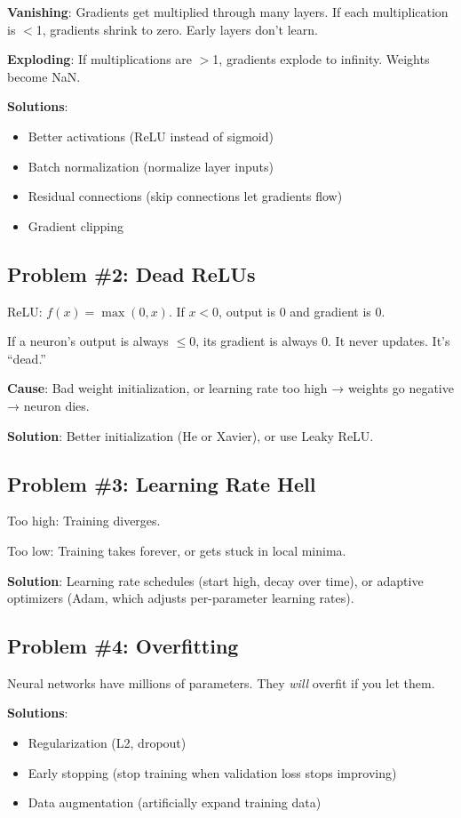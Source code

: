 \documentclass[11pt,oneside]{book}
\begin{document}
\textbf{Vanishing}: Gradients get multiplied through many layers. If each multiplication is $<$1, gradients shrink to zero. Early layers don't learn.

\textbf{Exploding}: If multiplications are $>$1, gradients explode to infinity. Weights become NaN.

\textbf{Solutions}:
\begin{itemize}
\item Better activations (ReLU instead of sigmoid)
\item Batch normalization (normalize layer inputs)
\item Residual connections (skip connections let gradients flow)
\item Gradient clipping
\end{itemize}

\subsection{Problem \#2: Dead ReLUs}

ReLU: $f(x) = \max(0, x)$. If $x < 0$, output is 0 and gradient is 0.

If a neuron's output is always $\leq 0$, its gradient is always 0. It never updates. It's ``dead.''

\textbf{Cause}: Bad weight initialization, or learning rate too high → weights go negative → neuron dies.

\textbf{Solution}: Better initialization (He or Xavier), or use Leaky ReLU.

\subsection{Problem \#3: Learning Rate Hell}

Too high: Training diverges.

Too low: Training takes forever, or gets stuck in local minima.

\textbf{Solution}: Learning rate schedules (start high, decay over time), or adaptive optimizers (Adam, which adjusts per-parameter learning rates).

\subsection{Problem \#4: Overfitting}

Neural networks have millions of parameters. They \textit{will} overfit if you let them.

\textbf{Solutions}:
\begin{itemize}
\item Regularization (L2, dropout)
\item Early stopping (stop training when validation loss stops improving)
\item Data augmentation (artificially expand training data)
\end{itemize}
\end{document}

